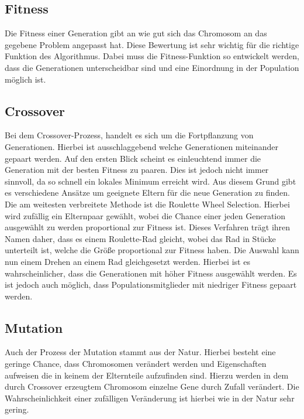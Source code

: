 \subsection{Fitness}
Die Fitness einer Generation gibt an wie gut sich das Chromosom an das gegebene Problem angepasst hat. Diese Bewertung ist sehr wichtig für die richtige Funktion des Algorithmus. Dabei muss die Fitness-Funktion so entwickelt werden, dass die Generationen unterscheidbar sind und eine Einordnung in der Population möglich ist. 

\subsection{Crossover}
\label{chap:grundlagen_cossover}
Bei dem Crossover-Prozess, handelt es sich um die Fortpflanzung von Generationen. Hierbei ist ausschlaggebend welche Generationen miteinander gepaart werden. Auf den ersten Blick scheint es einleuchtend immer die Generation mit der besten Fitness zu paaren. Dies ist jedoch nicht immer sinnvoll, da so schnell ein lokales Minimum erreicht wird. Aus diesem Grund gibt es verschiedene Ansätze um geeignete Eltern für die neue Generation zu finden.\cite{davis1991handbook} Die am weitesten verbreitete Methode ist die Roulette Wheel Selection. Hierbei wird zufällig ein Elternpaar gewählt, wobei die Chance einer jeden Generation ausgewählt zu werden proportional zur Fitness ist. Dieses Verfahren trägt ihren Namen daher, dass es einem Roulette-Rad gleicht, wobei das Rad in Stücke unterteilt ist, welche die Größe proportional zur Fitness haben. Die Auswahl kann nun einem Drehen an einem Rad gleichgesetzt werden. Hierbei ist es wahrscheinlicher, dass die Generationen mit höher Fitness ausgewählt werden. Es ist jedoch auch möglich, dass Populationsmitglieder mit niedriger Fitness gepaart werden.

\subsection{Mutation}
Auch der Prozess der Mutation stammt aus der Natur. Hierbei besteht eine geringe Chance, dass Chromosomen verändert werden und Eigenschaften aufweisen die in keinem der Elternteile aufzufinden sind. Hierzu werden in dem durch Crossover erzeugtem Chromosom einzelne Gene durch Zufall verändert. Die Wahrscheinlichkeit einer zufälligen Veränderung ist hierbei wie in der Natur sehr gering.\cite{davis1991handbook}


